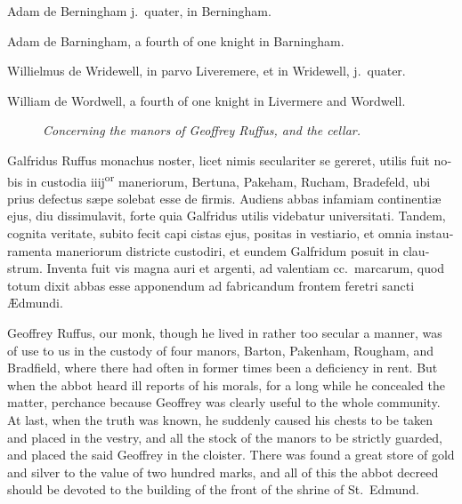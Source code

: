 \documentclass{book}
\newcommand{\blockhead}[4][]{
\begin{figure}
\centering
\vspace{#4}
\parbox{2.75cm}{\begin{center}\footnotesize \color{BrickRed} \emph{#2}\\ #1 \end{center}}
\end{figure}
}
\begin{document}
\begin{paracol}{2}
\switchcolumn*

\begin{otherlanguage}{latin}
Adam de Berningham j.\ quater, in Berningham.
\end{otherlanguage}

\switchcolumn

Adam de Barningham, a fourth of one knight in Barningham.

\switchcolumn*

\begin{otherlanguage}{latin}
Willielmus de Wridewell, in parvo Liveremere, et in Wridewell, j.\ quater.
\end{otherlanguage}

\switchcolumn

William de Wordwell, a fourth of one knight in Livermere and Wordwell.

\switchcolumn*

\begin{otherlanguage}{latin}
\blockhead{Concerning the manors of Geoffrey Ruffus, and the cellar.}{4}{-.45cm}
Galfridus Ruffus monachus noster, licet nimis seculariter se gereret, utilis fuit nobis in custodia iiij\textsuperscript{or} maneriorum, Bertuna, Pakeham, Rucham, Bradefeld, ubi prius defectus s\ae{}pe solebat esse de firmis. Audiens abbas infamiam continenti\ae{} ejus, diu dissimulavit, forte quia Galfridus utilis videbatur universitati. Tandem, cognita veritate, subito fecit capi cistas ejus, positas in vestiario, et omnia instauramenta maneriorum districte custodiri, et eundem Galfridum posuit in claustrum. Inventa fuit vis magna auri et argenti, ad valentiam cc.\ marcarum, quod totum dixit abbas esse apponendum ad fabricandum frontem feretri sancti \AE{}dmundi. 

\end{otherlanguage}

\switchcolumn

Geoffrey Ruffus, our monk, though he lived in rather too secular a manner, was of use to us in the custody of four manors, Barton, Pakenham, Rougham, and Bradfield, where there had often in former times been a deficiency in rent. But when the abbot heard ill reports of his morals, for a long while he concealed the matter, perchance because Geoffrey was clearly useful to the whole community. At last, when the truth was known, he suddenly caused his chests to be taken and placed in the vestry, and all the stock of the manors to be strictly guarded, and placed the said Geoffrey in the cloister. There was found a great store of gold and silver to the value of two hundred marks, and all of this the abbot decreed should be devoted to the building of the front of the shrine of St.\ Edmund.


\end{paracol}
\end{document}

